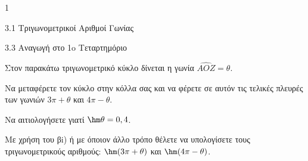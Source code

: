 \begin{ylh}{1}
\item 3.1 Τριγωνομετρικοί Αριθμοί Γωνίας
\item 3.3 Αναγωγή στο 1o Τεταρτημόριο
\end{ylh}
Στον παρακάτω τριγωνομετρικό κύκλο δίνεται η γωνία $\widehat{AOZ} = \theta$.
\begin{center}
\end{center}
\begin{alist}
\item Να μεταφέρετε τον κύκλο στην κόλλα σας και να φέρετε σε αυτόν τις τελικές πλευρές των γωνιών $3\pi + \theta$ και $4\pi - \theta$. 
\item \begin{rlist}
\item Να αιτιολογήσετε γιατί $\hm \theta = 0,4$. 
\item Με χρήση του βi) ή με όποιον άλλο τρόπο θέλετε να υπολογίσετε τους τριγωνομετρικούς αριθμούς: $\hm (3\pi + \theta)$ και $\hm (4\pi - \theta)$. 
\end{rlist}
\end{alist}

